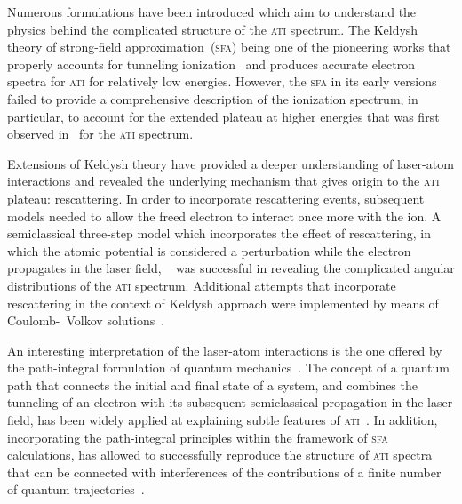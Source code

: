 Numerous formulations have been introduced which aim to understand the
physics behind the complicated structure of the \textsc{ati} spectrum.
The Keldysh theory of strong-field approximation~(\textsc{sfa}) being
one of the pioneering works that properly accounts for tunneling
ionization~\cite{KeldyshSFA} and produces accurate electron spectra
for \textsc{ati} for relatively low energies. However, the
\textsc{sfa} in its early versions failed to provide a comprehensive
description of the ionization spectrum, in particular, to account for
the extended plateau at higher energies that was first observed
in~\cite{Paulus_1994plateau} for the \textsc{ati} spectrum.

Extensions of Keldysh theory have provided a deeper understanding of
laser-atom interactions and revealed the underlying mechanism that
gives origin to the \textsc{ati} plateau: rescattering. In order to
incorporate rescattering events, subsequent models needed to allow the
freed electron to interact once more with the ion. A semiclassical
three-step model which incorporates the effect of rescattering, in
which the atomic potential is considered a perturbation while the
electron propagates in the laser field,
~\cite{Becker_rescattering1994,Becker_1994plateau_classical} was
successful in revealing the complicated angular distributions of the
\textsc{ati} spectrum. Additional attempts that incorporate
rescattering in the context of Keldysh approach were implemented by
means of Coulomb-~Volkov solutions~\cite{Kaminski_1997}.


An interesting interpretation of the laser-atom interactions is the
one offered by the path-integral formulation of quantum
mechanics~\cite{RevModPhysFeynman}. The concept of a quantum path that
connects the initial and final state of a system, and combines the
tunneling of an electron with its subsequent semiclassical propagation
in the laser field, has been widely applied at explaining subtle
features of \textsc{ati}~\cite{LewScience2001}. In addition,
incorporating the path-integral principles within the framework of
\textsc{sfa} calculations, has allowed to successfully reproduce the
structure of \textsc{ati} spectra that can be connected with
interferences of the contributions of a finite number of quantum
trajectories~\cite{KopoldOptComm2000}.



